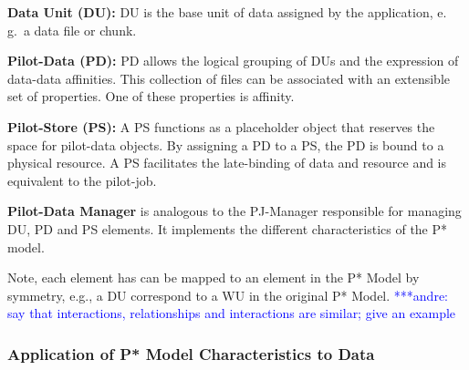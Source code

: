 \documentclass[conference,final]{IEEEtran}
\makeatletter
\def\reduwave{\bgroup \markoverwith{\lower3.5\p@\hbox{\sixly \textcolor{red}{\char58}}}\ULon}
\newcommand{\jwave}[1]{ {\reduwave{#1}}}
\newcommand{\jhanote}[1]{ {\textcolor{red} { ***shantenu: #1 }}}
\newcommand{\alnote}[1]{ {\textcolor{blue} { ***andre: #1 }}}
\newcommand{\jwave}[1]{#1}
\newcommand{\alnote}[1]{}
\newcommand{\jhanote}[1]{}
\makeatother
\begin{document}
\begin{compactenum}[A.]
\item \textbf{Data Unit (DU):} DU is the base unit of data assigned by
  the application,  e.\,g.\ a data file or chunk. 
\item \textbf{Pilot-Data (PD):} PD allows the logical grouping of DUs
  and the expression of data-data affinities. This collection of files
  can be associated with an extensible set of properties. One of these
  properties is affinity. 
\item \textbf{Pilot-Store (PS):} A PS functions as a placeholder
  object that reserves the space for pilot-data objects.  By assigning
  a PD to a PS, the PD is bound to a physical resource.  A PS
  facilitates the late-binding of data and resource and is equivalent
  to the pilot-job.
\item \textbf{Pilot-Data Manager} is analogous to the PJ-Manager
  responsible for managing DU, PD and PS elements. It implements the
  different characteristics of the P* model.
\end{compactenum}
 
Note, each element has can be mapped to an element in the P* Model by
symmetry, e.g., a DU correspond to a WU in the original P* Model. \alnote{say 
that interactions, relationships and interactions are similar; give an 
example}



\subsubsection*{Application of P* Model Characteristics to Data}
\end{document}
